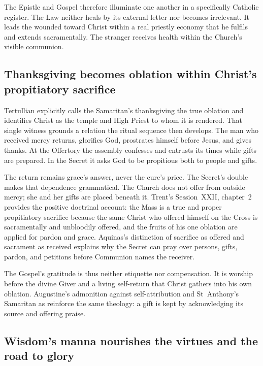 The Epistle and Gospel therefore illuminate one another in a specifically
Catholic register. The Law neither heals by its external letter nor becomes
irrelevant. It leads the wounded toward Christ within a real priestly economy
that he fulfils and extends sacramentally. The stranger receives health within
the Church's visible communion.

\subsection*{Thanksgiving becomes oblation within Christ's propitiatory sacrifice\enspace
  }

Tertullian explicitly calls the Samaritan's thanksgiving the true oblation and
identifies Christ as the temple and High Priest to whom it is rendered. That
single witness grounds a relation the ritual sequence then develops. The man
who received mercy returns, glorifies God, prostrates himself before Jesus, and
gives thanks. At the Offertory the assembly confesses 
and entrusts its times while gifts are prepared. In the Secret it asks God to
be propitious both to people and gifts.

The return remains grace's answer, never the cure's price. The Secret's double
 makes that dependence grammatical. The Church does not
offer from outside mercy; she and her gifts are placed beneath it. Trent's
Session~XXII, chapter~2 provides the positive doctrinal account: the Mass is a
true and proper propitiatory sacrifice because the same Christ who offered
himself on the Cross is sacramentally and unbloodily offered, and the fruits of
his one oblation are applied for pardon and grace. Aquinas's distinction of
sacrifice as offered and sacrament as received explains why the Secret can
pray over persons, gifts, pardon, and petitions before Communion names the
receiver.

The Gospel's gratitude is thus neither etiquette nor compensation. It is
worship before the divine Giver and a living self-return that Christ gathers
into his own oblation. Augustine's admonition against self-attribution and
St~Anthony's Samaritan as  reinforce the same theology: a gift is
kept by acknowledging its source and offering praise.

\subsection*{Wisdom's manna nourishes the virtues and the road to glory\enspace
  }

